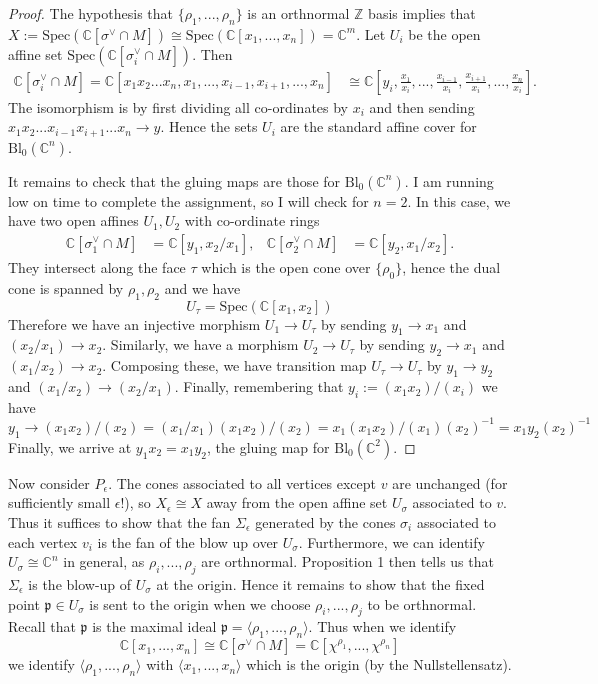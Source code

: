 \documentclass{article}
\newcommand{\C}{\mathbb{C}}
\newcommand{\Z}{\mathbb{Z}}
\newcommand{\Spec}{\text{Spec}}
\newcommand{\p}{\mathfrak{p}}
\begin{document}
\begin{proof}
	The hypothesis that $\{\rho_1,...,\rho_n\}$ is an orthnormal $\Z$ basis implies that $X:=\Spec(\C[\sigma^\vee\cap M]) \cong \Spec(\C[x_1,...,x_n]) = \C^m$. Let $U_i$ be the open affine set $\Spec(\C[\sigma_i^\vee\cap M])$. Then
	\begin{align*}
		\C[\sigma_i^\vee\cap M] = \C[x_1x_2...x_n, x_1,...,x_{i-1},x_{i+1},...,x_n] &\cong \C\left[y_i, \frac{x_1}{x_i},...,\frac{x_{i-1}}{x_{i}},\frac{x_{i+1}}{x_i},...,\frac{x_n}{x_i}\right].
	\end{align*}
	The isomorphism is by first dividing all co-ordinates by $x_i$ and then sending $x_1x_2...x_{i-1}x_{i+1}...{x_n} \to y$. Hence the sets $U_i$ are the standard affine cover for $\mathrm{Bl}_0(\C^n)$. \vspace{1em}

	It remains to check that the gluing maps are those for $\mathrm{Bl}_0(\C^n)$. I am running low on time to complete the assignment, so I will check for $n=2$. In this case, we have two open affines $U_1,U_2$ with co-ordinate rings
	\begin{align*}
		\C[\sigma_1^\vee \cap M] &= \C[y_1, x_2/x_1], & \C[\sigma_2^\vee\cap M]&=\C[y_2, x_1/x_2].
	\end{align*}
	They intersect along the face $\tau$ which is the open cone over $\{\rho_0\}$, hence the dual cone is spanned by $\rho_1,\rho_2$ and we have
	$$U_\tau = \Spec\left( \C[x_1,x_2] \right)$$
	Therefore we have an injective morphism $U_1\to U_\tau$ by sending $y_1\to x_1$ and $(x_2/x_1)\to x_2$. Similarly, we have a morphism $U_2\to U_\tau$ by sending $y_2\to x_1$ and $(x_1/x_2)\to x_2$. Composing these, we have transition map $U_\tau\to U_\tau$ by $y_1\to y_2$ and $(x_1/x_2)\to(x_2/x_1)$. Finally, remembering that $y_i := (x_1x_2)/(x_i)$ we have
	$$y_1 \to (x_1 x_2)/(x_2) = (x_1/x_1)(x_1 x_2)/(x_2) = x_1(x_1x_2)/(x_1) (x_2)^{-1} = x_1y_2 (x_2)^{-1}$$
	Finally, we arrive at $y_1x_2 = x_1y_2$, the gluing map for $\mathrm{Bl}_0(\C^2)$.
\end{proof}
	Now consider $P_\epsilon$. The cones associated to all vertices except $v$ are unchanged (for sufficiently small $\epsilon$!), so $X_\epsilon \cong X$ away from the open affine set $U_\sigma$ associated to $v$. Thus it suffices to show that the fan $\Sigma_\epsilon$ generated by the cones $\sigma_i$ associated to each vertex $v_i$ is the fan of the blow up over $U_\sigma$. Furthermore, we can identify $U_\sigma \cong \C^n$ in general, as $\rho_i,...,\rho_j$ are orthnormal. Proposition 1 then tells us that $\Sigma_\epsilon$ is the blow-up of $U_\sigma$ at the origin. Hence it remains to show that the fixed point $\p \in U_\sigma$ is sent to the origin when we choose $\rho_i,...,\rho_j$ to be orthnormal. Recall that $\p$ is the maximal ideal $\p=\langle\rho_1,...,\rho_n\rangle$. Thus when we identify
	$$\C[x_1,...,x_n]\cong \C[\sigma^\vee\cap M] = \C[\chi^{\rho_1},...,\chi^{\rho_n}]$$
	we identify $\langle \rho_1,...,\rho_n\rangle$ with $\langle x_1,...,x_n\rangle$ which is the origin (by the Nullstellensatz). \vspace{2em}
\end{document}
